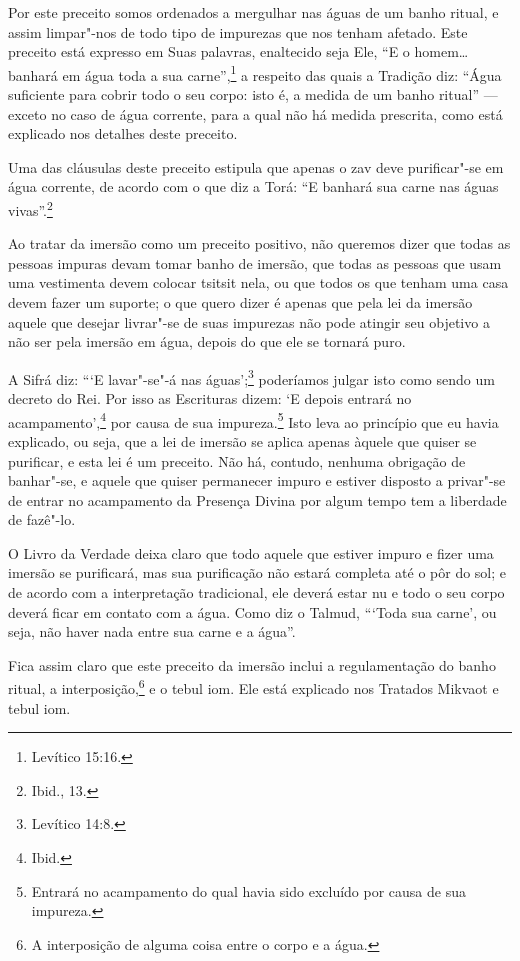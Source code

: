 \begin{multicols}{2}
Por este preceito somos ordenados a mergulhar nas águas de um banho
ritual, e assim limpar"-nos de todo tipo de impurezas que nos tenham
afetado. Este preceito está expresso em Suas palavras, enaltecido seja
Ele, ``E o homem\ldots{} banhará em água toda a sua carne'',\footnote{Levítico
15:16.} a respeito das quais a Tradição diz: ``Água suficiente para
cobrir todo o seu corpo: isto é, a medida de um banho ritual'' ---
exceto no caso de água corrente, para a qual não há medida prescrita,
como está explicado nos detalhes deste preceito.

Uma das cláusulas deste preceito estipula que apenas o zav\starr{} deve
purificar"-se em água corrente, de acordo com o que diz a Torá\starr: ``E
banhará sua carne nas águas vivas''.\footnote{Ibid., 13.}

Ao tratar da imersão como um preceito positivo, não queremos dizer que
todas as pessoas impuras devam tomar banho de imersão, que todas
as pessoas que usam uma vestimenta devem colocar tsitsit\starr{} nela, ou
que todos os que tenham uma casa devem fazer um suporte; o que quero
dizer é apenas que pela lei da imersão aquele que desejar livrar"-se de
suas impurezas não pode atingir seu objetivo a não ser pela imersão em
água, depois do que ele se tornará puro.

A Sifrá\starr{} diz: ```E lavar"-se"-á nas águas';\footnote{Levítico 14:8.} poderíamos
julgar isto como sendo um decreto do Rei. Por isso as Escrituras dizem:
`E depois entrará no acampamento',\footnote{Ibid.} por causa de sua
impureza.\footnote{Entrará no acampamento do qual havia sido excluído por causa de sua
  impureza.} Isto leva ao princípio que eu havia
explicado, ou seja, que a lei de imersão se aplica apenas àquele que
quiser se purificar, e esta lei é um preceito. Não há, contudo, nenhuma
obrigação de banhar"-se, e aquele que quiser permanecer impuro e estiver
disposto a privar"-se de entrar no acampamento da Presença Divina por
algum tempo tem a liberdade de fazê"-lo.

O Livro da Verdade deixa claro que todo aquele que estiver impuro e
fizer uma imersão se purificará, mas sua purificação não estará completa
até o pôr do sol; e de acordo com a interpretação tradicional, ele
deverá estar nu e todo o seu corpo deverá ficar em contato com a água.
Como diz o Talmud\starr, ```Toda sua carne', ou seja, não haver nada entre sua
carne e a água''.

Fica assim claro que este preceito da imersão inclui a regulamentação
do banho ritual, a interposição,\footnote{A interposição de alguma coisa entre o corpo e a água.} e o tebul iom\starr. Ele está explicado nos Tratados Mikvaot\starr{} e tebul iom\starr.


\end{multicols}
